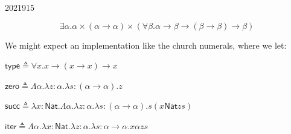 \documentclass[10pt,\jkfside,a4paper]{article}
\begin{document}
\begin{examquestion}{2021}{9}{15}
\begin{enumerate}
{                \[ 
                    \exists \alpha. \alpha \times (\alpha \to \alpha) \times (\forall \beta. \alpha \to \beta \to (\beta \to \beta) \to \beta)
                \]

                We might expect an implementation like the church numerals, where we let: 

                $\mathsf{type} \triangleq \forall x. x \to (x \to x) \to x$ 

                $\mathsf{zero} \triangleq \Lambda \alpha. \lambda z: \alpha. \lambda s: (\alpha \to \alpha). z$

                $\mathsf{succ} \triangleq \lambda x: \mathsf{Nat}. \Lambda \alpha. \lambda z: \alpha. \lambda s: (\alpha \to \alpha). s (x \mathsf{Nat} z s)$

                $\mathsf{iter} \triangleq \Lambda \alpha. \lambda x: \mathsf{Nat}. \lambda z: \alpha. \lambda s: \alpha \to \alpha. x \alpha z s$
            }

    \end{enumerate}

\end{examquestion}
\end{document}
